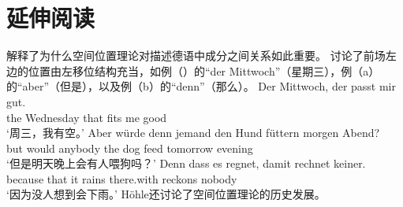 \section*{延伸阅读}
\citet{Reis80a}解释了为什么空间位置理论对描述德语中成分之间关系如此重要。 
\citet{Hoehle86}讨论了前场左边的位置由左移位结构充当，如例（）的“der Mittwoch”（星期三），例（a）的“aber”（但是），以及例（b）的“denn”（那么）。
\ea
\gll Der Mittwoch, der passt mir gut.\\
	 the Wednesday that fits me good\\
\glt `周三，我有空。'
\z
\eal
\ex 
\gll Aber würde denn jemand den Hund füttern morgen Abend?\\
     but would \particle{} anybody the dog feed tomorrow evening\\
\glt `但是明天晚上会有人喂狗吗？'
\ex 
\gll Denn dass es regnet, damit rechnet keiner.\\
     because that it rains there.with reckons nobody\\
\glt `因为没人想到会下雨。'
\zl
Höhle还讨论了空间位置理论的历史发展。

